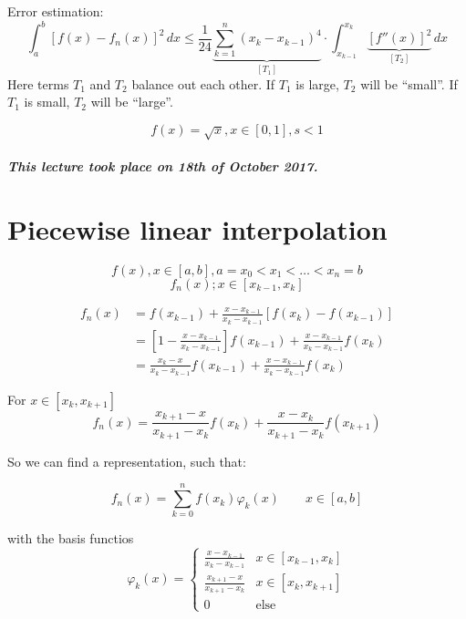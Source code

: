 \documentclass{article}
\newcommand{\pic}[2]{%
 \begin{figure}[t]
  \begin{center}
   \texttt{[image: \#1]}
   \caption{#2}
  \end{center}
 \end{figure}
}
\newcommand{\dateref}[1]{\paragraph{\textit{This lecture took place on #1.}}}
\begin{document}
Error estimation:
\[ \int_a^b \left[f(x) - f_n(x)\right]^2 \, dx \leq \frac1{24} \underbrace{\sum_{k=1}^n (x_k - x_{k-1})^4}_{[T_1]} \cdot \int_{x_{k-1}}^{x_k} \underbrace{[f''(x)]^2}_{[T_2]} \, dx \]
Here terms $T_1$ and $T_2$ balance out each other. If $T_1$ is large, $T_2$ will be \enquote{small}.  If $T_1$ is small, $T_2$ will be \enquote{large}.

\[ f(x) = \sqrt{x}, x \in [0,1], s < 1 \]

\dateref{18th of October 2017}

\section{Piecewise linear interpolation}

\[ f(x), x \in [a,b], a = x_0 < x_1 < \ldots < x_n = b \]
\[ f_n(x); x \in [x_{k-1}, x_k] \]

\begin{align*}
  f_n(x) &= f(x_{k-1}) + \frac{x - x_{k-1}}{x_k - x_{k-1}} \left[f(x_k) - f(x_{k-1})\right] \\
         &= \left[ 1 - \frac{x - x_{k-1}}{x_k - x_{k-1}} \right] f(x_{k-1}) + \frac{x - x_{k-1}}{x_k - x_{k-1}} f(x_k) \\
         &= \frac{x_k - x}{x_k - x_{k-1}} f(x_{k-1}) + \frac{x - x_{k-1}}{x_k - x_{k-1}} f(x_k)
\end{align*}

For $x \in [x_k, x_{k+1}]$
\[ f_n(x) = \frac{x_{k+1} - x}{x_{k+1} - x_k} f(x_k) + \frac{x - x_k}{x_{k+1} - x_k} f(x_{k+1}) \]

So we can find a representation, such that:

\[ f_n(x) = \sum_{k=0}^n f(x_k) \varphi_k(x) \qquad x \in [a,b] \]

with the basis functios
\[
  \varphi_k(x) = \begin{cases}
    \frac{x - x_{k-1}}{x_k - x_{k-1}} & x \in [x_{k-1}, x_k] \\
    \frac{x_{k+1} - x}{x_{k+1} - x_k} & x \in [x_k, x_{k+1}] \\
    0 & \text{else}
  \end{cases}
\]

\end{document}

